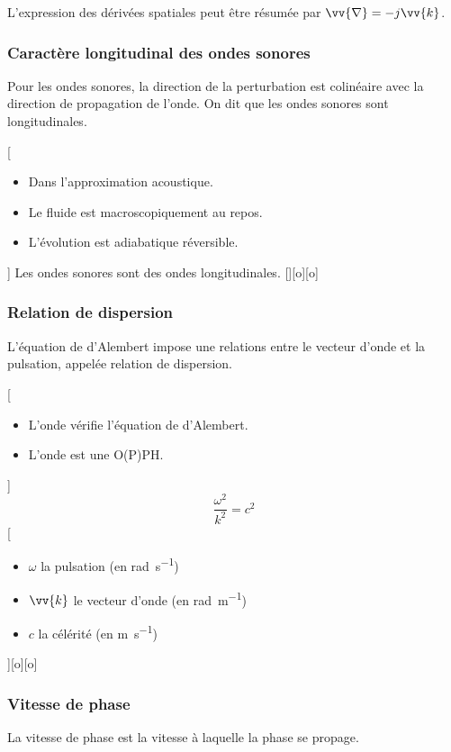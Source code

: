 L'expression des dérivées spatiales peut être résumée par $\vv{\nabla}=-j\vv{k}$.

\subsubsection{Caractère longitudinal des ondes sonores}
Pour les ondes sonores, la direction de la perturbation est colinéaire avec la direction de propagation de l'onde. On dit que les ondes sonores sont longitudinales.

[
    \begin{itemize}
        \item Dans l'approximation acoustique.
        \item Le fluide est macroscopiquement au repos.
        \item L'évolution est adiabatique réversible.
    \end{itemize}
]
{
    Les ondes sonores sont des ondes longitudinales.
}[][o][o]


\subsubsection{Relation de dispersion}
L'équation de d'Alembert impose une relations entre le vecteur d'onde et la pulsation, appelée relation de dispersion.

[
    \begin{itemize}
        \item L'onde vérifie l'équation de d'Alembert.
        \item L'onde est une O(P)PH.
    \end{itemize}
]
{
    $$\frac{\omega^2}{k^2}=c^2$$
}
[
    \begin{itemize}
        \item $\omega$ la pulsation (en \unit{rad.s^{-1}})
        \item $\vv{k}$ le vecteur d'onde (en \unit{rad.m^{-1}})
        \item $c$ la célérité (en \unit{m.s^{-1}})
    \end{itemize}
][o][o]

\subsubsection{Vitesse de phase}
La vitesse de phase est la vitesse à laquelle la phase se propage.

